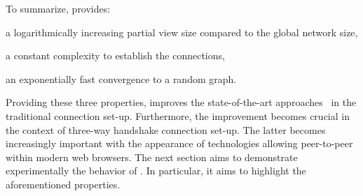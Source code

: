 To summarize, \SPRAY{} provides:
\begin{inparaenum}[(i)]
\item a logarithmically increasing partial view size compared to the global
  network size,
\item a constant complexity to establish the connections,
\item an exponentially fast convergence to a random graph.
\end{inparaenum}
Providing these three properties, \SPRAY{} improves the state-of-the-art
approaches~\cite{ganesh2001scamp,voulgaris2005cyclon} in the traditional
connection set-up. Furthermore, the improvement becomes crucial in the context
of three-way handshake connection set-up.  The latter becomes increasingly
important with the appearance of technologies allowing peer-to-peer within
modern web browsers.  The next section aims to demonstrate experimentally the
behavior of \SPRAY{}. In particular, it aims to highlight the aforementioned
properties.


